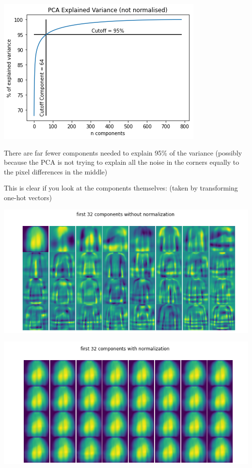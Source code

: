 \documentclass[11pt]{article}
\begin{document}
\begin{center}
\includegraphics[width=.9\linewidth]{.images/Experimentation_and_Results/2020-10-21_20-31-11_screenshot.png}
\end{center}

There are far fewer components needed to explain 95\% of the variance (possibly because the PCA is not trying to explain all the noise in the corners equally to the pixel differences in the middle)

This is clear if you look at the components themselves: (taken by transforming one-hot vectors)

\begin{center}
\includegraphics[width=.9\linewidth]{.images/Experimentation_and_Results/2020-10-21_20-35-29_screenshot.png}
\end{center}

\begin{center}
\includegraphics[width=.9\linewidth]{.images/Experimentation_and_Results/2020-10-21_20-35-49_screenshot.png}
\end{center}
\end{document}
